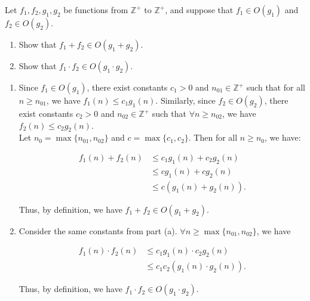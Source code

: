 \documentclass{article}
\begin{document}
\begin{question}
Let $f_1, f_2, g_1, g_2$ be functions from $\mathbb Z^+$ to $\mathbb Z^+$, and suppose that $f_1 \in O(g_1)$ and $f_2 \in O(g_2)$.

\begin{enumerate}[label = (\alph*)]
    \item Show that $f_1 + f_2 \in O(g_1 + g_2)$.
    \item Show that $f_1 \cdot f_2 \in O(g_1 \cdot g_2)$.
\end{enumerate}
\end{question}

\begin{solution}
\begin{enumerate}[label = (\alph*)]
    \item Since $f_1 \in O(g_1)$, there exist constants $c_1 > 0$ and $n_{01} \in \mathbb{Z}^+$ such that for all $n \geq n_{01}$, we have $f_1(n) \leq c_1 g_1(n)$. Similarly, since $f_2 \in O(g_2)$, there exist constants $c_2 > 0$ and $n_{02} \in \mathbb{Z}^+$ such that $\forall n \geq n_{02}$, we have $f_2(n) \leq c_2 g_2(n)$.\\
    
    Let $n_0 = \max\{n_{01}, n_{02}\}$ and $c = \max\{c_1, c_2\}$. Then for all $n \geq n_0$, we have:
    
   \begin{align*}
   	f_1(n) + f_2(n) &\leq c_1g_1(n) + c_2g_2(n)\\
	&\leq cg_1(n) + cg_2(n)\\
	&\leq c(g_1(n) + g_2(n)).
   \end{align*}
   
   Thus, by definition, we have $f_1 + f_2 \in O(g_1 + g_2)$.

    \item Consider the same constants from part (a). $\forall n \geq \max \{ n_{01}, n_{02} \}$, we have
    
       \begin{align*}
   	f_1(n) \cdot f_2(n) &\leq c_1g_1(n) \cdot c_2g_2(n)\\
	&\leq c_1c_2(g_1(n) \cdot g_2(n)).
   	\end{align*}
   
   Thus, by definition, we have  $f_1 \cdot f_2 \in O(g_1 \cdot g_2)$.
\end{enumerate}
\end{solution}
\end{document}
